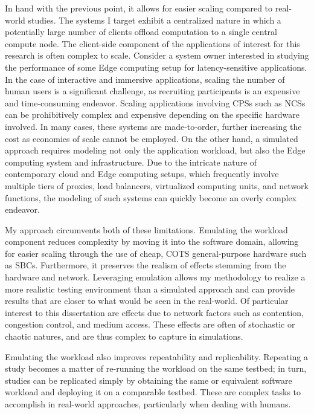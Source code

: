 In hand with the previous point, it allows for easier scaling compared to real-world studies.
The systems I target exhibit a centralized nature in which a potentially large number of clients offload computation to a single central compute node.
The client-side component of the applications of interest for this research is often complex to scale.
Consider a system owner interested in studying the performance of some Edge computing setup for latency-sensitive applications.
In the case of interactive and immersive applications, scaling the number of human users is a significant challenge, as recruiting participants is an expensive and time-consuming endeavor.
Scaling applications involving \glspl{CPS} such as \glspl{NCS} can be prohibitively complex and expensive depending on the specific hardware involved.
In many cases, these systems are made-to-order, further increasing the cost as economies of scale cannot be employed.
On the other hand, a simulated approach requires modeling not only the application workload, but also the Edge computing system and infrastructure.
Due to the intricate nature of contemporary cloud and Edge computing setups, which frequently involve multiple tiers of proxies, load balancers, virtualized computing units, and network functions, the modeling of such systems can quickly become an overly complex endeavor.

My approach circumvents both of these limitations.
Emulating the workload component reduces complexity by moving it into the software domain, allowing for easier scaling through the use of cheap, \gls{COTS} general-purpose hardware such as \glspl{SBC}.
Furthermore, it preserves the realism of effects stemming from the hardware and network.
Leveraging emulation allows my methodology to realize a more realistic testing environment than a simulated approach and can provide results that are closer to what would be seen in the real-world.
Of particular interest to this dissertation are effects due to network factors such as contention, congestion control, and medium access.
These effects are often of stochastic or chaotic natures, and are thus complex to capture in simulations.

Emulating the workload also improves repeatability and replicability.
Repeating a study becomes a matter of re-running the workload on the same testbed;
in turn, studies can be replicated simply by obtaining the same or equivalent software workload and deploying it on a comparable testbed.
These are complex tasks to accomplish in real-world approaches, particularly when dealing with humans.

